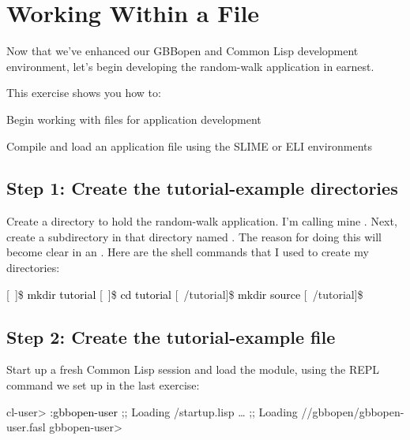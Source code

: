 \documentclass[10pt,twoside,english,pdftex]{article}
\begin{document}

\T\markright{}%
\T\pagestyle{plain}
\T\cleardoublepage
\W{}
\T\pagestyle{fancy}
\T\thispagestyle{fancybottom}
\T\renewcommand{\headrulewidth}{0pt}
\section{Working Within a File}
\label{sec:file}%

Now that we've enhanced our GBBopen and Common Lisp development environment,
let's begin developing the random-walk application in earnest.

\fndocrule

This exercise shows you how to:
\begin{tightitemize}
\item Begin working with files for application development
\item Compile and load an application file using the SLIME or ELI
  environments
\end{tightitemize}

\fndocrule

\subsection*{Step 1: Create the tutorial-example directories}

Create a directory to hold the random-walk application.  I'm calling mine
.  Next, create a subdirectory in that directory named
.  The reason for doing this will become clear in an
. Here are the shell commands
that I used to create my directories:
%
\W\supp
\begin{example}
\textcolor{darkergray}{%
  [~]\$ \textcolor{black}{mkdir tutorial}
  [~]\$ \textcolor{black}{cd tutorial}
  [~/tutorial]\$ \textcolor{black}{mkdir source}
  [~/tutorial]\$}
\end{example}

\subsection*{Step 2: Create the tutorial-example file}

Start up a fresh Common Lisp session and load the 
module, using the REPL command we set up in the last exercise:
%
\W\supp
\begin{smallexample}
\textcolor{darkergray}{%
  cl-user> \textcolor{black}{:gbbopen-user}
  ;; Loading /startup.lisp
     \textrm{\ldots{}}
  ;; Loading //gbbopen/gbbopen-user.fasl
  gbbopen-user>}
\end{smallexample}
\end{document}
